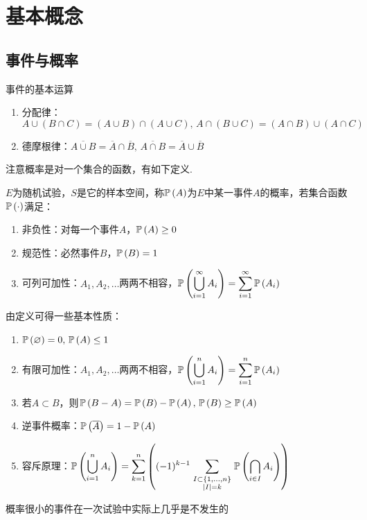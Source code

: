 
\section{基本概念}
\subsection{事件与概率}
\begin{proposition}事件的基本运算
	\begin{enumerate}
		\itemsep -3pt
		\item 分配律：$A\cup(B\cap C)=(A\cup B)\cap(A\cup C),\,A\cap(B\cup C)=(A\cap B)\cup(A\cap C)$
		\item 德摩根律：$\overline{A\cup B}=\overline{A}\cap\overline{B},\,\overline{A\cap B}=\overline{A}\cup\overline{B}$
	\end{enumerate}
\end{proposition}
注意概率是对一个集合的函数，有如下定义.
\begin{definition}[概率]
	$E$为随机试验，$S$是它的样本空间，称$\mathbb{P}\left(A\right)$为$E$中某一事件$A$的概率，若集合函数$\mathbb{P}\left(\cdot\right)$满足：
	\begin{enumerate}
		\itemsep -3pt
		\item 非负性：对每一个事件$A$，$\mathbb{P}\left(A\right)\geq 0$
		\item 规范性：必然事件$B$，$\mathbb{P}\left(B\right)=1$
		\item 可列可加性：$A_1,A_2,\ldots$两两不相容，$\displaystyle \mathbb{P}\left(\bigcup_{i=1}^\infty A_i\right)=\sum_{i=1}^\infty \mathbb{P}\left(A_i\right)$
	\end{enumerate}
\end{definition}
由定义可得一些基本性质：
\begin{enumerate}
	\itemsep -3pt
	\item $\mathbb{P}\left(\varnothing\right)=0,\,\mathbb{P}\left(A\right)\leq 1$
	\item 有限可加性：$A_1,A_2,\ldots$两两不相容，$\displaystyle \mathbb{P}\left(\bigcup_{i=1}^n A_i\right)=\sum_{i=1}^n \mathbb{P}\left(A_i\right)$
	\item 若$A\subset B$，则$\mathbb{P}\left(B-A\right)=\mathbb{P}\left(B\right)-\mathbb{P}\left(A\right),\,\mathbb{P}\left(B\right)\geq \mathbb{P}\left(A\right)$
	\item 逆事件概率：$\mathbb{P}\left(\overline{A}\right)=1-\mathbb{P}\left(A\right)$
	\item 容斥原理：$\displaystyle \mathbb{P}\left(\bigcup _{{i=1}}^{n}A_{i}\right)=\sum _{{k=1}}^{n}\left((-1)^{{k-1}}\sum _{{\scriptstyle I\subset \{1,\ldots ,n\} \atop \scriptstyle |I|=k}}\mathbb{P}\left(\bigcap _{{i\in I}}A_{i}\right)\right)$
\end{enumerate}
\begin{theorem}[实际推断原理]
概率很小的事件在一次试验中实际上几乎是不发生的
\end{theorem}

